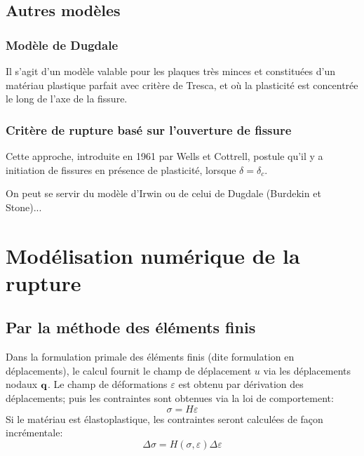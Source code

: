 \medskip
\subsection{Autres modèles}
\medskip
\subsubsection{Modèle de Dugdale}

Il s'agit d'un modèle valable pour les plaques très minces et constituées d'un matériau plastique
parfait avec critère de Tresca, et
où la plasticité est concentrée le long de l'axe de la fissure.

\medskip
\subsubsection{Critère de rupture basé sur l'ouverture de fissure}

Cette approche, introduite en 1961 par Wells et
Cottrell, postule qu'il y a initiation de fissures
en présence de plasticité, lorsque $\delta=\delta_c$.

On peut se servir du modèle d'Irwin ou de celui de Dugdale (Burdekin et Stone)...


\medskip
\section{Modélisation numérique de la rupture}

\medskip
\subsection{Par la méthode des éléments finis}

Dans la formulation primale des éléments finis (dite formulation en déplacements), le
calcul fournit le champ de déplacement $u$ via les déplacements nodaux $\VV{q}$.
Le champ de déformations $\varepsilon$ est obtenu par dérivation des déplacements;
puis les contraintes sont obtenues via la loi de comportement:
\begin{equation}\sigma=H\varepsilon\end{equation}
Si le matériau est élastoplastique, les contraintes seront calculées de façon
incrémentale:
\begin{equation}\Delta\sigma=H(\sigma,\varepsilon)\Delta\varepsilon\end{equation}

